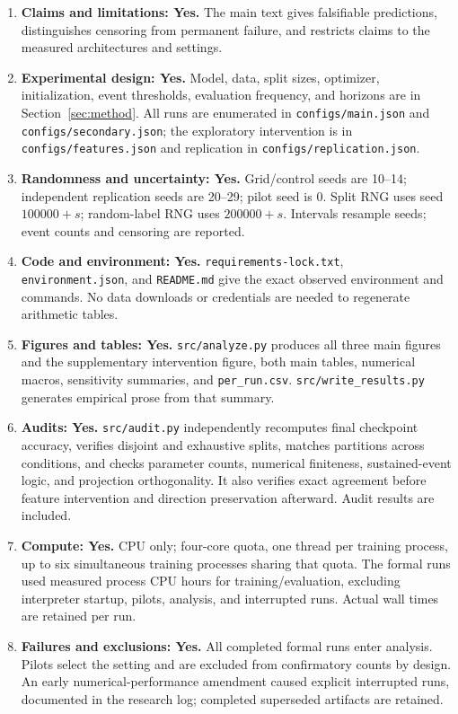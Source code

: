 \documentclass{article}
\begin{document}
\begin{enumerate}
\item \textbf{Claims and limitations: Yes.} The main text gives falsifiable predictions, distinguishes censoring from permanent failure, and restricts claims to the measured architectures and settings.
\item \textbf{Experimental design: Yes.} Model, data, split sizes, optimizer, initialization, event thresholds, evaluation frequency, and horizons are in Section~\ref{sec:method}. All runs are enumerated in \texttt{configs/main.json} and \texttt{configs/secondary.json}; the exploratory intervention is in \texttt{configs/features.json} and replication in \texttt{configs/replication.json}.
\item \textbf{Randomness and uncertainty: Yes.} Grid/control seeds are 10--14; independent replication seeds are 20--29; pilot seed is 0. Split RNG uses seed $100000+s$; random-label RNG uses $200000+s$. Intervals resample seeds; event counts and censoring are reported.
\item \textbf{Code and environment: Yes.} \texttt{requirements-lock.txt}, \texttt{environment.json}, and \texttt{README.md} give the exact observed environment and commands. No data downloads or credentials are needed to regenerate arithmetic tables.
\item \textbf{Figures and tables: Yes.} \texttt{src/analyze.py} produces all three main figures and the supplementary intervention figure, both main tables, numerical macros, sensitivity summaries, and \texttt{per\_run.csv}. \texttt{src/write\_results.py} generates empirical prose from that summary.
\item \textbf{Audits: Yes.} \texttt{src/audit.py} independently recomputes final checkpoint accuracy, verifies disjoint and exhaustive splits, matches partitions across conditions, and checks parameter counts, numerical finiteness, sustained-event logic, and projection orthogonality. It also verifies exact agreement before feature intervention and direction preservation afterward. Audit results are included.
\item \textbf{Compute: Yes.} CPU only; four-core quota, one thread per training process, up to six simultaneous training processes sharing that quota. The \RunCount{} formal runs used \CPUHours{} measured process CPU hours for training/evaluation, excluding interpreter startup, pilots, analysis, and interrupted runs. Actual wall times are retained per run.
\item \textbf{Failures and exclusions: Yes.} All completed formal runs enter analysis. Pilots select the setting and are excluded from confirmatory counts by design. An early numerical-performance amendment caused explicit interrupted runs, documented in the research log; completed superseded artifacts are retained.

\end{enumerate}
\end{document}
